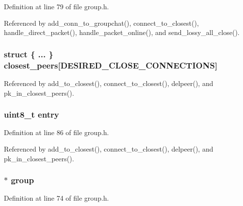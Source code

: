 Definition at line 79 of file group.\+h.



Referenced by add\+\_\+conn\+\_\+to\+\_\+groupchat(), connect\+\_\+to\+\_\+closest(), handle\+\_\+direct\+\_\+packet(), handle\+\_\+packet\+\_\+online(), and send\+\_\+lossy\+\_\+all\+\_\+close().

\hypertarget{struct_group__c_a8987e8417b5a1a5bc11ba79885c12590}{
\subsubsection[{closest\+\_\+peers}]{\setlength{\rightskip}{0pt plus 5cm}struct \{ ... \}   closest\+\_\+peers\mbox{[}{\bf D\+E\+S\+I\+R\+E\+D\+\_\+\+C\+L\+O\+S\+E\+\_\+\+C\+O\+N\+N\+E\+C\+T\+I\+O\+N\+S}\mbox{]}}}\label{struct_group__c_a8987e8417b5a1a5bc11ba79885c12590}


Referenced by add\+\_\+to\+\_\+closest(), connect\+\_\+to\+\_\+closest(), delpeer(), and pk\+\_\+in\+\_\+closest\+\_\+peers().

\hypertarget{struct_group__c_adbdb38b7f14c384804844026547a276e}{
\subsubsection[{entry}]{\setlength{\rightskip}{0pt plus 5cm}uint8\+\_\+t entry}}\label{struct_group__c_adbdb38b7f14c384804844026547a276e}


Definition at line 86 of file group.\+h.



Referenced by add\+\_\+to\+\_\+closest(), connect\+\_\+to\+\_\+closest(), delpeer(), and pk\+\_\+in\+\_\+closest\+\_\+peers().

\hypertarget{struct_group__c_a1f68599dc07252599a98f6d044a184e9}{
\subsubsection[{group}]{$\ast$ group}}\label{struct_group__c_a1f68599dc07252599a98f6d044a184e9}


Definition at line 74 of file group.\+h.



